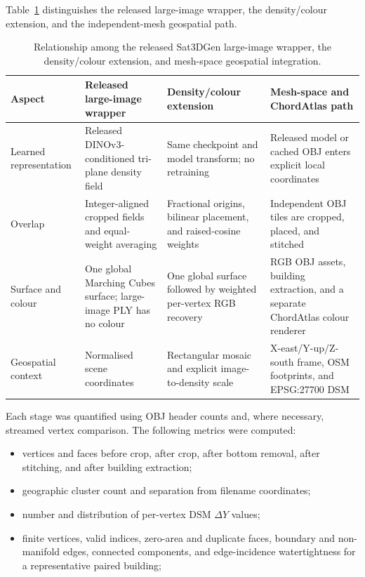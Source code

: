 Table~\ref{tab:sat3dgen-method-comparison} distinguishes the released
large-image wrapper, the density/colour extension, and the independent-mesh
geospatial path.

\begin{table}[H]
\centering
\caption{Relationship among the released Sat3DGen large-image wrapper, the
density/colour extension, and mesh-space geospatial integration.}
\label{tab:sat3dgen-method-comparison}
\footnotesize
\begin{tabularx}{\textwidth}{p{}XXX}
\toprule
Aspect & Released large-image wrapper & Density/colour extension &
Mesh-space and ChordAtlas path\\
\midrule
Learned representation & Released DINOv3-conditioned tri-plane density field &
Same checkpoint and model transform; no retraining & Released model or cached
OBJ enters explicit local coordinates\\
Overlap & Integer-aligned cropped fields and equal-weight averaging &
Fractional origins, bilinear placement, and raised-cosine weights & Independent
OBJ tiles are cropped, placed, and stitched\\
Surface and colour & One global Marching Cubes surface; large-image PLY has no
colour & One global surface followed by weighted per-vertex RGB recovery & RGB
OBJ assets, building extraction, and a separate ChordAtlas colour renderer\\
Geospatial context & Normalised scene coordinates & Rectangular mosaic and
explicit image-to-density scale & X-east/Y-up/Z-south frame, OSM footprints,
and EPSG:27700 DSM\\
\bottomrule
\end{tabularx}
\end{table}

Each stage was quantified using OBJ header counts and, where necessary,
streamed vertex comparison.  The following metrics were computed:

\begin{itemize}
  \item vertices and faces before crop, after crop, after bottom removal, after
  stitching, and after building extraction;
  \item geographic cluster count and separation from filename coordinates;
  \item number and distribution of per-vertex DSM $\Delta Y$ values;
  \item finite vertices, valid indices, zero-area and duplicate faces, boundary
  and non-manifold edges, connected components, and edge-incidence
  watertightness for a representative paired building; 
\end{itemize}

